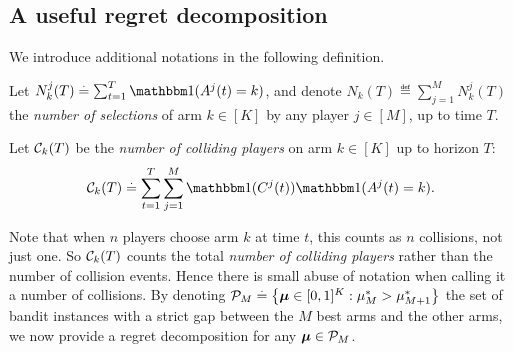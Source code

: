 \subsection{A useful regret decomposition}
\label{sub:5:defregret}

We introduce additional notations in the following definition.
%
\begin{definition}\label{def:5:nbSelections_nbCollisions}
\begin{leftbar}[defnbar]  %
  Let $N_k^j(T) \eqdef \sum_{t=1}^T \indic(A^j(t) = k)$,
  and denote $N_k(T) \eqdef \sum_{j=1}^M N_k^j(T)$ the \emph{number of selections} of arm $k\in[K]$ by any player $j\in[M]$, up to time $T$.

  Let $\mathcal{C}_k(T)$ be the \emph{number of colliding players} on arm $k\in[K]$ up to horizon $T$:
  \begin{equation}
    \cC_k(T) \eqdef
    \sum_{t=1}^{T} \sum_{j=1}^{M} \indic(C^j(t)) \indic(A^j(t) = k).
  \end{equation}
\end{leftbar}  %
\end{definition}

Note that when $n$ players choose arm $k$ at time $t$, this counts as $n$ collisions, not just one. So $\mathcal{C}_k(T)$ counts the total \emph{number of colliding players} rather than the number of collision events. Hence there is small abuse of notation when calling it a number of collisions.
%
By denoting $\mathcal{P}_M \overset{.}{=} \left\{ \boldsymbol{\mu} \in [0,1]^K : \mu_M^* > \mu_{M+1}^*\right\}$
the set of bandit instances with a strict gap between the $M$ best arms and the other arms, we now provide a regret decomposition for any $\boldsymbol{\mu} \in \mathcal{P}_M$.

